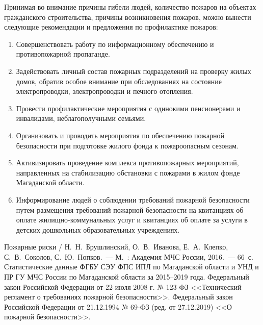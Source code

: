 Принимая во внимание причины гибели людей, количество пожаров на объектах гражданского строительства, причины возникновения пожаров, можно вынести следующие рекомендации и предложения по профилактике пожаров:
\begin{enumerate}[noitemsep]\vspace{-8pt}
  \item Совершенствовать работу по информационному обеспечению и противопожарной пропаганде.
  \item Задействовать личный состав пожарных подразделений на проверку жилых домов, обратив особое внимание при обследованиях на состояние электропроводки, электропроводки и печного отопления.
  \item Провести профилактические мероприятия с одинокими пенсионерами и инвалидами, неблагополучными семьями.
  \item Организовать и проводить мероприятия по обеспечению пожарной безопасности при подготовке жилого фонда к пожароопасным сезонам.
  \item Активизировать проведение комплекса противопожарных мероприятий, направленных на стабилизацию обстановки с пожарами в жилом фонде Магаданской области.
  \item Информирование людей о соблюдении требований пожарной безопасности путем размещения требований пожарной безопасности на квитанциях об оплате жилищно-коммунальных услуг и квитанциях об оплате за услуги в детских дошкольных образовательных учреждениях.
\end{enumerate}
\vspace{-8pt}

\begin{thebibliography}{99}
\bibitem{}Пожарные риски / Н.~Н.~Брушлинский, О.~В.~Иванова, Е.~А.~Клепко, С.~В.~Соколов, С.~Ю.~Попков.~--- М.~: Академия МЧС России, 2016.~--- 66~с.
\bibitem{}Статистические данные ФГБУ СЭУ ФПС ИПЛ по Магаданской области и УНД и ПР ГУ МЧС России по Магаданской области за 2015--2019 года.
\bibitem{}Федеральный закон Российской Федерации от 22 июля 2008 г. № 123-ФЗ  <<Технический регламент о требованиях пожарной безопасности>>.
\bibitem{}Федеральный закон Российской Федерации от 21.12.1994 № 69-ФЗ (ред. от 27.12.2019) <<О пожарной безопасности>>.
\end{thebibliography}
